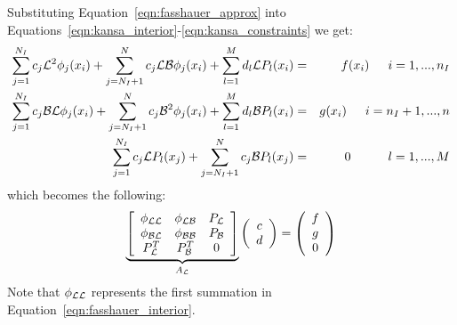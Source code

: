 \documentclass[11pt]{report}
\begin{document}
{Substituting Equation~\ref{eqn:fasshauer_approx} into Equations~\ref{eqn:kansa_interior}-\ref{eqn:kansa_constraints} we get: 
\begin{eqnarray}
\sum_{j=1}^{N_I}c_j\mathcal{L}^2{\phi_j(x_i)} + \sum_{j=N_I+1}^{N}c_j\mathcal{L}\mathcal{B}\phi_j(x_i) + \sum_{l=1}^{M}d_l \mathcal{L}P_l(x_i) &=&f(x_i)  \hskip1.5em i = 1,...,n_I  \label{eqn:fasshauer_interior} \\ 
\sum_{j=1}^{N_I}c_j\mathcal{B}\mathcal{L}\phi_j(x_i) + \sum_{j=N_I+1}^{N}c_j\mathcal{B}^2{\phi_j(x_i)} + \sum_{l=1}^{M}d_l \mathcal{B}P_l(x_i) &=& g(x_i)  \hskip1.5em i = n_I + 1,..., n \label{eqn:fasshauer_boundary} \nonumber \\
\sum_{j=1}^{N_I} c_j \mathcal{L}P_l(x_j) + \sum_{j=N_I + 1}^{N} c_j \mathcal{B}P_l(x_j) &=& 0 \hskip3.0em l=1,...,M \label{eqn:fasshauer_constraints} \nonumber 
\end{eqnarray}
which becomes the following: 
\begin{eqnarray}
\underbrace{\left[ \begin{array}{c c c} 
	\phi_{\mathcal{L}\mathcal{L}} & \phi_{\mathcal{L}\mathcal{B}} & P_{\mathcal{L}} \\
	\phi_{\mathcal{B}\mathcal{L}} & \phi_{\mathcal{B}\mathcal{B}} & P_{\mathcal{B}} \\
	P^T_{\mathcal{L}} & P^T_{\mathcal{B}} & 0 \\
	\end{array} \right]}_{A_{\mathcal{L}}} \left( \begin{array}{c}
							{c} \\
							{d}
							 \end{array}
						 \right) = \left( \begin{array}{c}
							{f} \\
							{g} \\
							0
							 \end{array}
						 \right) 
	\label{eqn:fasshauer_method}
\end{eqnarray}
Note that $\phi_{\mathcal{L}\mathcal{L}}$ represents the first summation in Equation~\ref{eqn:fasshauer_interior}. 

}
\end{document}
